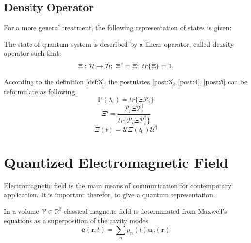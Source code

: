         \subsection{Density Operator}
            For a more general treatment, the following representation of states is given:
            \begin{definition}
                The state of quantum system is described by a linear operator, called density
                operator such that:
                \begin{equation*}
                    \Xi:\Hilbert\to\Hilbert;\ \Xi^\dagger=\Xi;\ tr\{\Xi\}=1.
                \end{equation*}
                \label{def:3}
            \end{definition}
            According to the definition \ref{def:3}, the postulates \ref{post:3}, \ref{post:4},
            \ref{post:5} can be reformulate as following.
            \begin{equation}
                \mathbb{P}(\lambda_i)=tr\{\Xi\mathcal{P}_i\}
                \label{post:3.1}
            \end{equation}
            \begin{equation}
                \Xi'=\frac{\mathcal{P}_i\Xi\mathcal{P}_i^\dagger}
                {tr\{\mathcal{P}_i\Xi\mathcal{P}_i^\dagger\}}
                \label{post:4.1}
            \end{equation}
            \begin{equation}
                \Xi(t)=\mathcal{U}\Xi(t_0)\mathcal{U}^\dagger
                \label{post:5.1}
            \end{equation}

        \section{Quantized Electromagnetic Field}
            Electromagnetic field is the main means of communication for contemporary
            application. It is important therefor, to give a quantum representation.
            \par In a volume $\mathcal{V}\in\mathbb{R}^3$ classical magnetic field is 
            determinated from Maxwell's equations as a superposition of the cavity modes
            \begin{equation}
                \mathbf{e}(\mathbf{r},t)=\sum_n p_n (t)\mathbf{u}_n (\mathbf{r})
            \end{equation}
